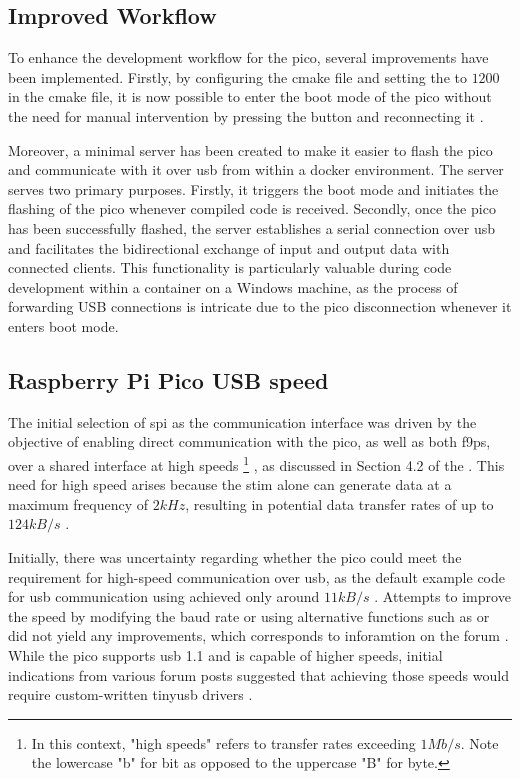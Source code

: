 \subsection{Improved Workflow}

To enhance the development workflow for the \gls{pico}, several improvements have been implemented.
Firstly, by configuring the \gls{cmake} file and setting the  to $1200$ in the \gls{cmake} file, it is now possible to enter the boot mode of the \gls{pico} without the need for manual intervention by pressing the  button and reconnecting it \cite{hermannswAnswerSettingUsb2021}.

Moreover, a minimal \py server has been created to make it easier to flash the \gls{pico} and communicate with it over \gls{usb} from within a \gls{docker} environment.
The server serves two primary purposes.
Firstly, it triggers the boot mode and initiates the flashing of the \gls{pico} whenever compiled code is received.
Secondly, once the \gls{pico} has been successfully flashed, the server establishes a serial connection over \gls{usb} and facilitates the bidirectional exchange of input and output data with connected clients.
This functionality is particularly valuable during code development within a container on a Windows machine, as the process of forwarding USB connections is intricate due to the \gls{pico} disconnection whenever it enters boot mode.


\subsection{Raspberry Pi Pico USB speed}

The initial selection of \gls{spi} as the communication interface was driven by the objective of enabling direct communication with the \gls{pico}, as well as both \glspl{f9p}, over a shared interface at high speeds
\footnote{In this context, "high speeds" refers to transfer rates exceeding $1Mb/s$.
    Note the lowercase "b" for bit as opposed to the uppercase "B" for byte.}
, as discussed in Section 4.2 of the \preproject.
This need for high speed arises because the \gls{stim} alone can generate data at a maximum frequency of $2kHz$, resulting in potential data transfer rates of up to $124kB/s$ \cite[34]{safranSTIM300Datasheet}.

Initially, there was uncertainty regarding whether the \gls{pico} could meet the requirement for high-speed communication over \gls{usb}, as the default example code for \gls{usb} communication using  achieved only around $11kB/s$ \cite[usb/device]{RaspberryPiPico2023}.
Attempts to improve the speed by modifying the baud rate or using alternative functions such as  or  did not yield any improvements, which corresponds to inforamtion on the forum \cite{hippyAnswerSettingUsb2021}.
While the \gls{pico} supports \gls{usb} 1.1 and is capable of higher speeds, initial indications from various forum posts suggested that achieving those speeds would require custom-written \gls{tinyusb} drivers \cite[usb/device]{RaspberryPiPico2023}.

